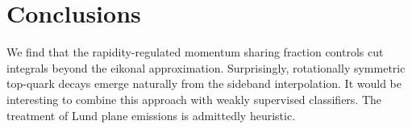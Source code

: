 \section{Conclusions}\label{sec:conclusions}

We find that the rapidity-regulated momentum sharing fraction controls
cut integrals beyond the eikonal approximation. Surprisingly,
rotationally symmetric top-quark decays emerge naturally from the
sideband interpolation. It would be interesting to combine this approach
with weakly supervised classifiers. The treatment of Lund plane
emissions is admittedly heuristic.

